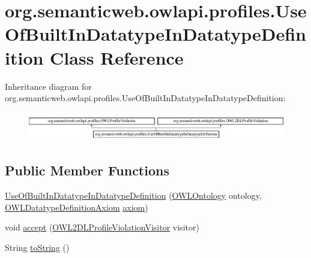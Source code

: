 \hypertarget{classorg_1_1semanticweb_1_1owlapi_1_1profiles_1_1_use_of_built_in_datatype_in_datatype_definition}{\section{org.\-semanticweb.\-owlapi.\-profiles.\-Use\-Of\-Built\-In\-Datatype\-In\-Datatype\-Definition Class Reference}
\label{classorg_1_1semanticweb_1_1owlapi_1_1profiles_1_1_use_of_built_in_datatype_in_datatype_definition}
}
Inheritance diagram for org.\-semanticweb.\-owlapi.\-profiles.\-Use\-Of\-Built\-In\-Datatype\-In\-Datatype\-Definition\-:\begin{figure}[H]
\begin{center}
\leavevmode
\includegraphics[height=1.281464cm]{classorg_1_1semanticweb_1_1owlapi_1_1profiles_1_1_use_of_built_in_datatype_in_datatype_definition}
\end{center}
\end{figure}
\subsection*{Public Member Functions}
\begin{DoxyCompactItemize}
\item 
\hyperlink{classorg_1_1semanticweb_1_1owlapi_1_1profiles_1_1_use_of_built_in_datatype_in_datatype_definition_a3246ffc5823d36749ecb0fa042907d05}{Use\-Of\-Built\-In\-Datatype\-In\-Datatype\-Definition} (\hyperlink{interfaceorg_1_1semanticweb_1_1owlapi_1_1model_1_1_o_w_l_ontology}{O\-W\-L\-Ontology} ontology, \hyperlink{interfaceorg_1_1semanticweb_1_1owlapi_1_1model_1_1_o_w_l_datatype_definition_axiom}{O\-W\-L\-Datatype\-Definition\-Axiom} \hyperlink{classorg_1_1semanticweb_1_1owlapi_1_1profiles_1_1_o_w_l_profile_violation_aa7c8e8910ed3966f64a2c003fb516214}{axiom})
\item 
void \hyperlink{classorg_1_1semanticweb_1_1owlapi_1_1profiles_1_1_use_of_built_in_datatype_in_datatype_definition_a243bbcc66632067b79d27d87c509e112}{accept} (\hyperlink{interfaceorg_1_1semanticweb_1_1owlapi_1_1profiles_1_1_o_w_l2_d_l_profile_violation_visitor}{O\-W\-L2\-D\-L\-Profile\-Violation\-Visitor} visitor)
\item 
String \hyperlink{classorg_1_1semanticweb_1_1owlapi_1_1profiles_1_1_use_of_built_in_datatype_in_datatype_definition_a51d63f1cb84fecf5de13aad0e3ea44f7}{to\-String} ()
\end{DoxyCompactItemize}


